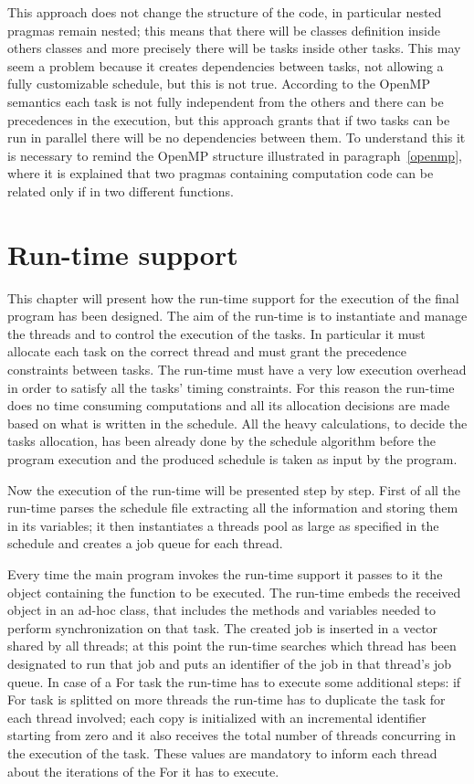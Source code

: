 \documentclass[a4paper,12pt,oneside]{book}
\begin{document}
This approach does not change the structure of the code, in particular nested pragmas remain nested; this means that there will be classes definition inside others classes and more precisely there will be tasks inside other tasks. This may seem a problem because it creates dependencies between tasks, not allowing a fully customizable schedule, but this is not true. According to the OpenMP semantics each task is not fully independent from the others and there can be precedences in the execution, but this approach grants that if two tasks can be run in parallel there will be no dependencies between them. To understand this it is necessary to remind the OpenMP structure illustrated in paragraph~\ref{openmp}, where it is explained that two pragmas containing computation code can be related only if in two different functions. 


\section{Run-time support}

This chapter will present how the run-time support for the execution of the final program has been designed. The aim of the run-time is to instantiate and manage the threads and to control the execution of the tasks. In particular it must allocate each task on the correct thread and must grant the precedence constraints between tasks. The run-time must have a very low execution overhead in order to satisfy all the tasks' timing constraints. For this reason the run-time does no time consuming computations and all its allocation decisions are made based on what is written in the schedule. All the heavy calculations, to decide the tasks allocation, has been already done by the schedule algorithm before the program execution and the produced schedule is taken as input by the program. 

Now the execution of the run-time will be presented step by step. First of all the run-time parses the schedule file extracting all the information and storing them in its variables; it then instantiates a threads pool as large as specified in the schedule and creates a job queue for each thread. 

Every time the main program invokes the run-time support it passes to it the object containing the function to be executed. The run-time embeds the received object in an ad-hoc class, that includes the methods and variables needed to perform synchronization on that task. The created job is inserted in a vector shared by all threads; at this point the run-time searches which thread has been designated to run that job and puts an identifier of the job in that thread’s job queue. In case of a For task the run-time has to execute some additional steps: if For task is splitted on more threads the run-time has to duplicate the task for each thread involved; each copy is initialized with an incremental identifier starting from zero and it also receives the total number of threads concurring in the execution of the task. These values are mandatory to inform each thread about the iterations of the For it has to execute. 
\end{document}
